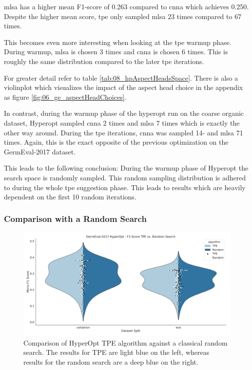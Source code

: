 \gls{mlsa} has a higher mean F1-score of 0.263 compared to \gls{cnna} which achieves 0.250. Despite the higher mean score, \gls{tpe} only sampled \gls{mlsa} 23 times compared to 67 times.

This becomes even more interesting when looking at the \gls{tpe} warmup phase. During warmup, \gls{mlsa} is chosen 3 times and \gls{cnna} is chosen 6 times. This is roughly the same distribution compared to the later \gls{tpe} iterations. 

For greater detail refer to table \ref{tab:08_hpAspectHeadsSpace}. There is also a violinplot which visualizes the impact of the aspect head choice in the appendix as figure \ref{fig:06_ge_aspectHeadChoices}.
\medskip

In contrast, during the warmup phase of the hyperopt run on the coarse organic dataset, Hyperopt sampled \gls{cnna} 2 times and \gls{mlsa} 7 times which is exactly the other way around. During the \gls{tpe} iterations, \gls{cnna} was sampled 14- and \gls{mlsa} 71 times. Again, this is the exact opposite of the previous optimization on the GermEval-2017 dataset.
\medskip

This leads to the following conclusion: During the warmup phase of Hyperopt the search space is randomly sampled. This random sampling distribution is adhered to during the whole \gls{tpe} suggestion phase. This leads to results which are heavily dependent on the first 10 random iterations.

\subsubsection*{Comparison with a Random Search}

\begin{figure}[ht]
	\centering
	\includegraphics[width=\textwidth]{figures/06_results/06_hp_ge_vio_tpeRand}
	\caption{Comparison of HyperOpt TPE algorithm against a classical random search. The results for TPE are light blue on the left, whereas results for the random search are a deep blue on the right.}
	\label{fig:06_HpOptimTpe_Rand}
\end{figure}

